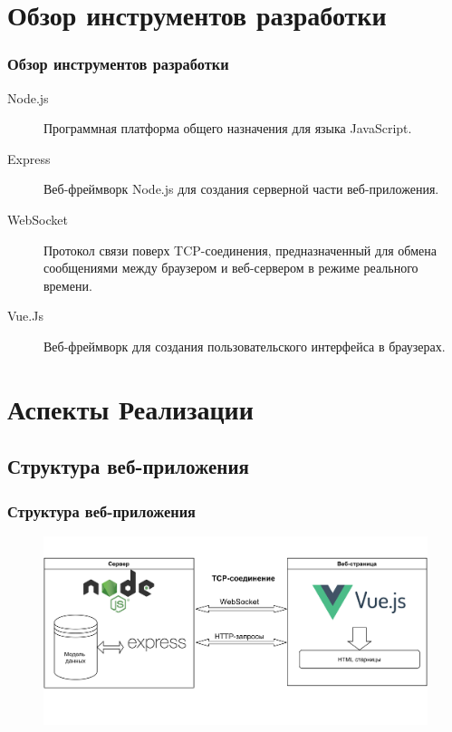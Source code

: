 \documentclass{beamer}
\begin{document}
\section{Обзор инструментов разработки}
\begin{frame}
\frametitle{Обзор инструментов разработки}
\begin{description}
	\item[Node.js] Программная платформа общего назначения для языка JavaScript. 
	\item[Express] Веб-фреймворк Node.js для создания серверной части веб-приложения.
	\item[WebSocket] Протокол связи поверх TCP-соединения, предназначенный для обмена сообщениями между браузером и веб-сервером в режиме реального времени.
	\item[Vue.Js] Веб-фреймворк для создания пользовательского интерфейса в браузерах.  
\end{description}
\end{frame}

\section{Аспекты Реализации}

\subsection{Структура веб-приложения}
\begin{frame}
\frametitle{Структура веб-приложения}
\begin{figure}
\includegraphics[width=\linewidth]{img/webdiagram.png}
\end{figure}
\end{frame}

\end{document}
